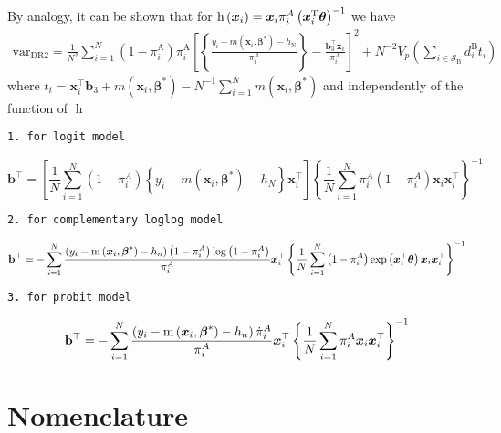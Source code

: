 \documentclass[
  letterpaper,
  DIV=11,
  numbers=noendperiod]{scrreprt}
\begin{document}
By analogy, it can be shown that for
\(\operatorname{h}\left(\boldsymbol{x}_i\right) = \boldsymbol{x}_i \pi_i^A\left(\boldsymbol{x}_i^{\mathrm{T}} \boldsymbol{\theta} \right)^{-1}\)
we have \[
\begin{gathered}
\text{var}_{\mathrm{DR} 2}=\frac{1}{N^2} \sum_{i=1}^N\left(1-\pi_i^{\mathrm{A}}\right) \pi_i^{\mathrm{A}}\left[\left\{\frac{y_i-m\left(\boldsymbol{x}_i, \boldsymbol{\beta}^*\right)-h_{\mathrm{N}}}{\pi_i^A}\right\} -
\frac{\mathbf{b}_3^{\top} \boldsymbol{x}_i}{\pi_i^A}\right]^2 + N^{-2} V_p\left(\sum_{i \in \mathcal{S}_{\mathrm{B}}} d_i^{\mathrm{B}} t_i\right)
\end{gathered}
\] where
\(t_i= \boldsymbol{x}_i^{\top} \mathbf{b}_3+m\left(\boldsymbol{x}_i, \boldsymbol{\beta}^*\right)-N^{-1} \sum_{i=1}^N m\left(\boldsymbol{x}_i, \boldsymbol{\beta}^*\right)\)
and independently of the function of \(\operatorname{h}\)

\begin{verbatim}
1. for logit model
\end{verbatim}

\[
\mathbf{b}^{\top}=\left[\frac{1}{N} \sum_{i=1}^N\left(1-\pi_i^A\right)\left\{y_i-m\left(\boldsymbol{x}_i, \boldsymbol{\beta}^*\right)-h_N\right\} \boldsymbol{x}_i^{\top}\right]\left\{\frac{1}{N} \sum_{i=1}^N \pi_i^A\left(1-\pi_i^A\right) \boldsymbol{x}_i \boldsymbol{x}_i^{\top}\right\}^{-1}
\]

\begin{verbatim}
2. for complementary loglog model
\end{verbatim}

\[\mathbf{b}^{\top} = -\sum_{i=1}^N \frac{\left(y_i - \operatorname{m}\left(\boldsymbol{x}_i,\boldsymbol{\beta}^*\right) - h_n\right)\left(1 - \pi_i^A\right) \log \left(1 - \pi_i^A\right)}{\pi_i^A}\boldsymbol{x}_i^{\top} \left\{\frac{1}{N}\sum_{i=1}^N \left(1 - \pi_i^A\right) \exp\left(\boldsymbol{x}_i^{\top}\boldsymbol{\theta}\right) \boldsymbol{x}_i \boldsymbol{x}_i^{\top}\right\} ^ {-1}\]

\begin{verbatim}
3. for probit model
\end{verbatim}

\[\mathbf{b}^{\top} = -\sum_{i=1}^N \frac{\left(y_i - \operatorname{m}\left(\boldsymbol{x}_i,\boldsymbol{\beta}^*\right) - h_n\right)\dot{\pi}_i^A}{\pi_i^A}\boldsymbol{x}_i^{\top} \left\{\frac{1}{N}\sum_{i=1}^N \pi_i^A \boldsymbol{x}_i \boldsymbol{x}_i^{\top}\right\} ^ {-1}\]

\chapter{Nomenclature}\label{nomenclature}
\end{document}
